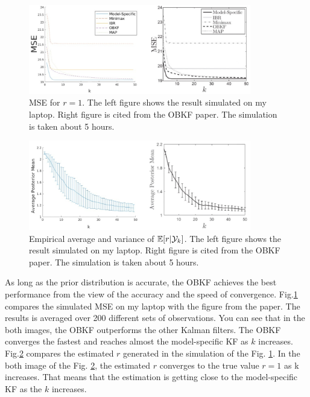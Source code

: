 \begin{figure}[H]
    \begin{center}
    \includegraphics[width=9.7cm]{img/r1_mse.eps}
    \caption{MSE for $r=1$. The left figure shows the result simulated on my laptop. Right figure is cited from the OBKF paper\cite{Dehghannasiri2018}. The simulation is taken about 5 hours.}
    \label{fig:mse_r1}
    \end{center}
\end{figure}
\begin{figure}[H]
    \begin{center}
    \includegraphics[width=9.7cm]{img/r1_mean.eps}
    \caption{Empirical average and variance of $\mathbb{E}[r|\mathcal{Y}_k]$. The left figure shows the result simulated on my laptop. Right figure is cited from the OBKF paper\cite{Dehghannasiri2018}. The simulation is taken about 5 hours.}
    \label{fig:mean_r1}
    \end{center}
\end{figure}

As long as the prior distribution is accurate, the OBKF achieves the best performance from the view of the accuracy and the speed of convergence. Fig.\ref{fig:mse_r1} compares the simulated MSE on my laptop with the figure from the paper. The results is averaged over 200 different sets of observations. You can see that in the both images, the OBKF outperforms the other Kalman filters. The OBKF converges the fastest and reaches almost the model-specific KF as $k$ increases. Fig.\ref{fig:mean_r1} compares the estimated $r$ generated in the simulation of the Fig. \ref{fig:mse_r1}. In the both image of the Fig. \ref{fig:mean_r1}, the estimated $r$ converges to the true value $r=1$ as k increases. That means that the estimation is getting close to the model-specific KF as the $k$ increases.

